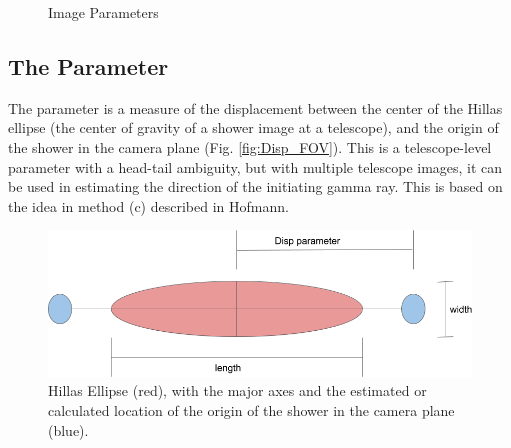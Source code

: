 \documentclass[main.tex]{subfiles}
\begin{document}
\begin{figure}[htbp]
  \centering
  \caption[Image parameters]{Image Parameters}
  \label{fig:img_params}
\end{figure}

\subsection{The \disp Parameter}
The \disp parameter is a measure of the displacement between the center of the Hillas ellipse (the center of gravity of a shower image at a telescope), and the origin of the shower in the camera plane (Fig. \ref{fig:Disp_FOV}). This is a telescope-level parameter with a head-tail ambiguity, but with multiple telescope images, it can be used in estimating the direction of the initiating gamma ray. This is based on the idea in method (c) described in Hofmann\cite{Hofmann:1999dx}.
\begin{figure}[htbp]
  \centering
  \includegraphics[width=.58\linewidth]{images/Disp_param}
  \caption[The Hillas ellipse]{Hillas Ellipse (red), with the major axes and the estimated or calculated location of the origin of the shower in the camera plane (blue).}
  \label{fig:hillas_ellipse}
\end{figure}
\end{document}
